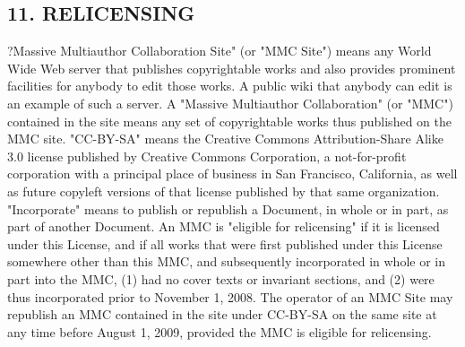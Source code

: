 \subsection{11. RELICENSING}


?Massive Multiauthor Collaboration Site" (or "MMC Site") means any World Wide Web server that publishes copyrightable works and also provides prominent facilities for anybody to edit those works. A public wiki that anybody can edit is an example of such a server. A "Massive Multiauthor Collaboration" (or "MMC") contained in the site means any set of copyrightable works thus published on the MMC site.
"CC-BY-SA" means the Creative Commons Attribution-Share Alike 3.0 license published by Creative Commons Corporation, a not-for-profit corporation with a principal place of business in San Francisco, California, as well as future copyleft versions of that license published by that same organization.
"Incorporate" means to publish or republish a Document, in whole or in part, as part of another Document.
An MMC is "eligible for relicensing" if it is licensed under this License, and if all works that were first published under this License somewhere other than this MMC, and subsequently incorporated in whole or in part into the MMC, (1) had no cover texts or invariant sections, and (2) were thus incorporated prior to November 1, 2008.
The operator of an MMC Site may republish an MMC contained in the site under CC-BY-SA on the same site at any time before August 1, 2009, provided the MMC is eligible for relicensing.


